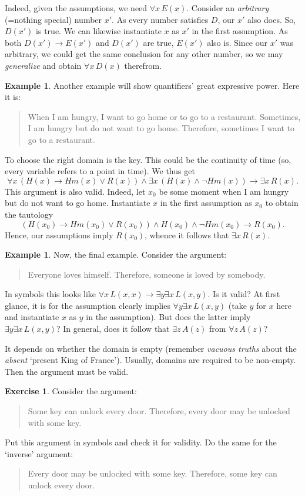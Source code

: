 \documentclass[12pt,notitlepage]{article}
\theoremstyle{plain}
\theoremstyle{definition}
\newtheorem{exc}[thm]{Exercise}
\newtheorem{exm}[thm]{Example}
\theoremstyle{plain}
\newcommand{\1}{\mathbf{1}}
\newcommand{\0}{\mathbf{0}}
\begin{document}
Indeed, given the assumptions, we need $\forall x\, E(x)$. Consider an \emph{arbitrary} (=nothing special) number $x'$. As every number satisfies $D$, our $x'$ also does. So, $D(x')$ is true. We can likewise instantiate $x$ as $x'$ in the first assumption. As both $D(x') \to E(x')$ and $D(x')$ are true, $E(x')$ also is. Since our $x'$ was arbitrary, we could get the same conclusion for any other number, so we may \emph{generalize} and obtain $\forall x\, D(x)$ therefrom.
\begin{exm}

Another example will show quantifiers' great expressive power. Here it is:
\begin{quote}
When I am hungry, I want to go home or to go to a restaurant. Sometimes, I am hungry but do not want to go home. Therefore, sometimes I want to go to a restaurant. 
\end{quote}
To choose the right domain is the key. This could be the continuity of time (so, every variable refers to a point in time). We thus get $$\forall x\, (H(x) \to Hm(x) \vee R(x)) \wedge \exists x\, (H(x) \wedge \neg Hm(x)) \to \exists x\, R(x).$$ This argument is also valid. Indeed, let $x_0$ be some moment when I am hungry but do not want to go home. Instantiate $x$ in the first assumption as $x_0$ to obtain the tautology
$$(H(x_0) \to Hm(x_0) \vee R(x_0)) \wedge H(x_0) \wedge \neg Hm(x_0) \to R(x_0).$$
Hence, our assumptions imply $R(x_0)$, whence it follows that $\exists x\, R(x)$.
\end{exm}

\begin{exm}
Now, the final example. Consider the argument:
\begin{quote}
Everyone loves himself. Therefore, someone is loved by somebody.
\end{quote}
In symbols this looks like $\forall x\, L(x,x) \to \exists y \exists x\, L(x,y)$. Is it valid? At first glance, it is for the assumption clearly implies $\forall y \exists x\, L(x,y)$ (take $y$ for $x$ here and instantiate $x$ as $y$ in the assumption). But does the latter imply  $\exists y \exists x\, L(x,y)$? In general, does it follow that $\exists z\, A(z)$ from $\forall z\, A(z)$?

It depends on whether the domain is empty (remember \emph{vacuous truths} about the \emph{absent} `present King of France'). Usually, domains are required to be non-empty. Then the argument must be valid.
\end{exm}

\begin{exc}
Consider the argument:
\begin{quote}
Some key can unlock every door. Therefore, every door may be unlocked with some key.
\end{quote}
Put this argument in symbols and check it for validity. Do the same for the `inverse' argument:
\begin{quote}
Every door may be unlocked with some key. Therefore, some key can unlock every door.
\end{quote}

\end{exc}
\end{document}

